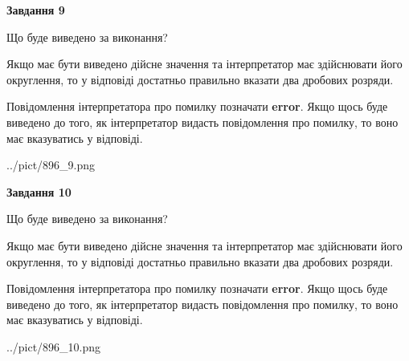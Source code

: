 \documentclass[12pt, ukrainian]{article}
\begin{document}
{\begin {Large}
{\begin {center}\textbf{Завдання 9}\end {center}}\par
Що буде виведено за виконання? \par

Якщо має бути виведено дійсне значення та інтерпретатор має здійснювати його округлення, 
то у відповіді достатньо правильно вказати два дробових розряди.

Повідомлення інтерпретатора про помилку позначати \textbf{error}.
Якщо щось буде виведено до того, як інтерпретатор видасть повідомлення про помилку, 
то воно має вказуватись у відповіді. \par

\begin{center}
	{../pict/896_9.png}
\end{center}
\newpage

{\begin {center}\textbf{Завдання 10}\end {center}}\par
Що буде виведено за виконання? \par

Якщо має бути виведено дійсне значення та інтерпретатор має здійснювати його округлення, 
то у відповіді достатньо правильно вказати два дробових розряди.

Повідомлення інтерпретатора про помилку позначати \textbf{error}.
Якщо щось буде виведено до того, як інтерпретатор видасть повідомлення про помилку, 
то воно має вказуватись у відповіді. \par

\begin{center}
	{../pict/896_10.png}
\end{center}
\newpage

\end {Large}}
\end{document}

